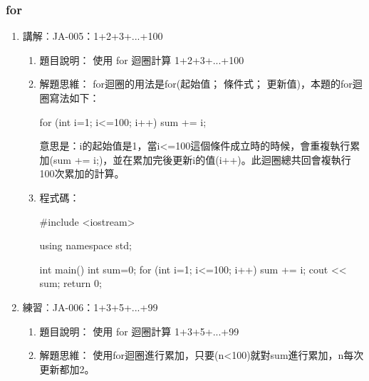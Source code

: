\subsubsection {for}
\begin{enumerate}
	\item 講解︰JA-005：1+2+3+...+100
		\begin{enumerate}
			\item 題目說明：
			\subitem 使用 for 迴圈計算 1+2+3+...+100
			
			\item 解題思維：
			\subitem for迴圈的用法是for(起始值； 條件式； 更新值)，本題的for迴圈寫法如下：
			\begin{inside}
				for (int i=1; i<=100; i++) sum += i;
			\end{inside}
			意思是：i的起始值是1，當i<=100這個條件成立時的時候，會重複執行累加(sum += i;)，並在累加完後更新i的值(i++)。此迴圈總共回會複執行100次累加的計算。
			
			\item 程式碼：
			\begin{cppcode}
				#include <iostream>
				
				using namespace std;
				
				int main()
				{
					int sum=0;
					for (int i=1; i<=100; i++) sum += i;
					cout << sum;
					return 0;
				}
				
			\end{cppcode}
		\end{enumerate}
	
	\item 練習︰JA-006：1+3+5+...+99
		\begin{enumerate}
			\item 題目說明：
			\subitem 使用 for 迴圈計算 1+3+5+...+99
			
			\item 解題思維：
			\subitem 使用for迴圈進行累加，只要(n<100)就對sum進行累加，n每次更新都加2。

		\end{enumerate}
	
\end{enumerate}

